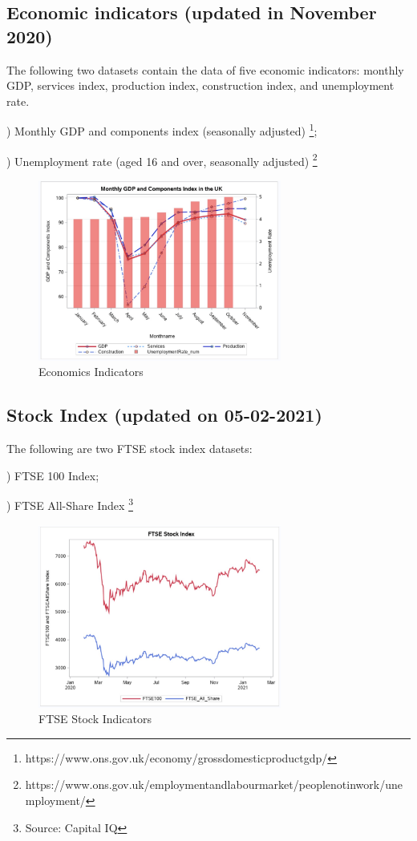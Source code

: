 \documentclass[12pt, a4paper]{report}
\begin{document}
\subsection{Economic indicators (updated in November 2020)} 
The following two datasets contain the data of five economic indicators: monthly GDP, services index, 
production index, construction index, and unemployment rate.\par
{}) Monthly GDP and components index (seasonally adjusted)
\footnote[4]{https://www.ons.gov.uk/economy/grossdomesticproductgdp/};\par
{}) Unemployment rate (aged 16 and over, seasonally adjusted)
\footnote[5]{https://www.ons.gov.uk/employmentandlabourmarket/peoplenotinwork/unemployment/}
\begin{figure}[H] 
\centering 
\includegraphics[width=8cm]{economics.jpg} 
\caption{Economics Indicators}
\end{figure}
    
\subsection{Stock Index (updated on 05-02-2021)}
The following are two FTSE stock index datasets:\par
{}) FTSE 100 Index;\par
{}) FTSE All-Share Index
\footnote[6]{Source: Capital IQ}
\begin{figure}[H] 
\centering 
\includegraphics[width=8cm]{ftse.jpg} 
\caption{FTSE Stock Indicators}
\end{figure}
        
\end{document}
